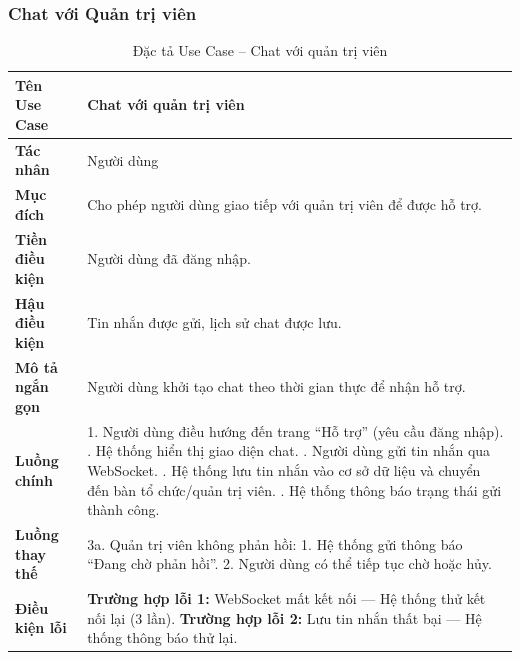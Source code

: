 \subsubsection{Chat với Quản trị viên}
\renewcommand{\arraystretch}{1.3}
\setlength{\tabcolsep}{8pt}
\begin{longtable}{|p{}|p{}|}
\caption{Đặc tả Use Case -- Chat với quản trị viên}
\label{tab:uc_chat_admin} \\
\hline
\textbf{Tên Use Case} & Chat với quản trị viên \\ \hline
\textbf{Tác nhân} & Người dùng \\ \hline
\textbf{Mục đích} & Cho phép người dùng giao tiếp với quản trị viên để được hỗ trợ. \\ \hline
\textbf{Tiền điều kiện} & Người dùng đã đăng nhập. \\ \hline
\textbf{Hậu điều kiện} & Tin nhắn được gửi, lịch sử chat được lưu. \\ \hline
\textbf{Mô tả ngắn gọn} & Người dùng khởi tạo chat theo thời gian thực để nhận hỗ trợ. \\ \hline
\textbf{Luồng chính} &
1. Người dùng điều hướng đến trang “Hỗ trợ” (yêu cầu đăng nhập). \newline
2. Hệ thống hiển thị giao diện chat. \newline
3. Người dùng gửi tin nhắn qua WebSocket. \newline
4. Hệ thống lưu tin nhắn vào cơ sở dữ liệu và chuyển đến bàn tổ chức/quản trị viên. \newline
5. Hệ thống thông báo trạng thái gửi thành công. \\ \hline
\textbf{Luồng thay thế} &
3a. Quản trị viên không phản hồi: \newline
\hspace*{1em}1. Hệ thống gửi thông báo “Đang chờ phản hồi”. \newline
\hspace*{1em}2. Người dùng có thể tiếp tục chờ hoặc hủy. \\ \hline
\textbf{Điều kiện lỗi} &
\textbf{Trường hợp lỗi 1:} WebSocket mất kết nối — Hệ thống thử kết nối lại (3 lần). \newline
\textbf{Trường hợp lỗi 2:} Lưu tin nhắn thất bại — Hệ thống thông báo thử lại. \\ \hline
\end{longtable}
\vspace{15pt}

